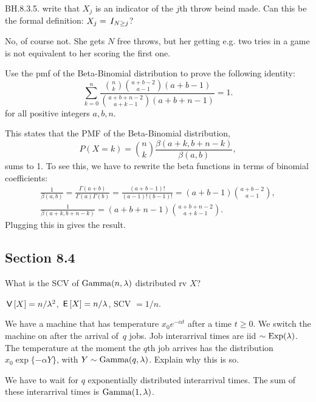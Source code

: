 \begin{exercise}
BH.8.3.5. write that $X_j$ is an indicator of the $j$th throw beind made. Can this be the formal definition: $X_j = \,I_{N\geq j}$?
\begin{solution}
No, of course not. She gets $N$ free throws, but her getting e.g. two tries in a game is not equivalent to her scoring the first one.
\end{solution}
\end{exercise}


\begin{exercise}
Use the pmf of the Beta-Binomial distribution to prove the following identity:
\begin{equation*}
   \sum_{k=0}^n \frac{\binom{n}{k}\binom{a+b-2}{a-1}  (a+b-1) }{\binom{a+b+n-2}{a+k-1}(a+b+n-1)} = 1.
\end{equation*}
for all positive integers $a, b, n$.
\begin{solution}
This  states that the PMF of the Beta-Binomial distribution, $$P(X=k) = \binom{n}{k} \frac{\beta(a+k,b+n-k)}{\beta(a,b)},$$ sums to 1. To see this, we have to rewrite the beta functions in terms of binomial coefficients:
\begin{align*}
   \frac{1}{\beta(a,b)} = \frac{\Gamma(a+b)}{\Gamma(a)\Gamma(b)} = \frac{(a+b-1)!}{(a-1)! (b-1)!} = (a+b-1) \binom{a+b-2}{a-1}, \\
   \frac{1}{\beta(a+k,b+n-k)}  = (a+b+n-1) \binom{a+b+n-2}{a+k-1}.
\end{align*}
Plugging this in gives the result.
\end{solution}
\end{exercise}



\subsection*{Section 8.4}
\label{sec:section-8.4}

\begin{exercise}
What is the SCV of $\mathrm{Gamma}(n, \lambda)$ distributed rv $X$?
\begin{solution}
$\,\mathsf{V}\left[X\right] = n/\lambda^{2}$, $\,\mathsf{E}\left[X\right] = n/\lambda$, SCV $=1/n$.
\end{solution}
\end{exercise}

\begin{exercise}
We have a machine that has temperature $x_0e^{-\alpha t}$ after a time $t\geq 0$. We switch the machine on after the arrival of~$q$ jobs. Job interarrival times are iid $\sim\mathrm{Exp}(\lambda)$. The temperature at the moment the $q$th job arrives has the distribution $x_0\exp\{-\alpha Y\}$, with $Y\sim \mathrm{Gamma}(q, \lambda)$. Explain why this is so.
\begin{solution}
We have to wait for $q$ exponentially distributed interarrival times. The sum of these interarrival times is $\mathrm{Gamma}(1, \lambda)$.
\end{solution}
\end{exercise}




